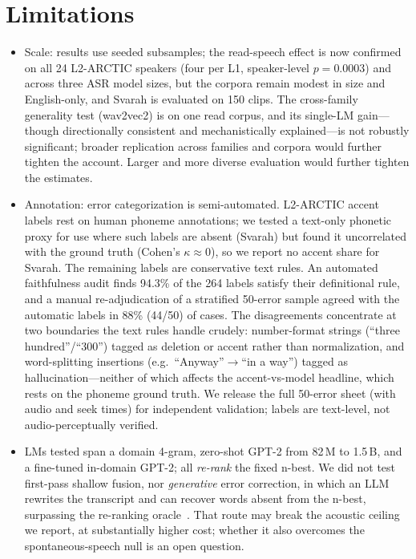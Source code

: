 \documentclass[conference]{IEEEtran}
\begin{document}
\section{Limitations}
\label{sec:lim}
\begin{itemize}
\item Scale: results use seeded subsamples; the read-speech effect is now confirmed on all 24 L2-ARCTIC speakers (four per L1, speaker-level $p=0.0003$) and across three ASR model sizes, but the corpora remain modest in size and English-only, and Svarah is evaluated on 150 clips. The cross-family generality test (wav2vec2) is on one read corpus, and its single-LM gain---though directionally consistent and mechanistically explained---is not robustly significant; broader replication across families and corpora would further tighten the account. Larger and more diverse evaluation would further tighten the estimates.
\item Annotation: error categorization is semi-automated. L2-ARCTIC accent labels rest on human phoneme annotations; we tested a text-only phonetic proxy for use where such labels are absent (Svarah) but found it uncorrelated with the ground truth (Cohen's $\kappa\approx0$), so we report no accent share for Svarah. The remaining labels are conservative text rules. An automated faithfulness audit finds 94.3\% of the 264 labels satisfy their definitional rule, and a manual re-adjudication of a stratified 50-error sample agreed with the automatic labels in 88\% (44/50) of cases. The disagreements concentrate at two boundaries the text rules handle crudely: number-format strings (``three hundred''/``300'') tagged as deletion or accent rather than normalization, and word-splitting insertions (e.g.\ ``Anyway''$\to$``in a way'') tagged as hallucination---neither of which affects the accent-vs-model headline, which rests on the phoneme ground truth. We release the full 50-error sheet (with audio and seek times) for independent validation; labels are text-level, not audio-perceptually verified.
\item LMs tested span a domain 4-gram, zero-shot GPT-2 from 82\,M to 1.5\,B, and a fine-tuned in-domain GPT-2; all \emph{re-rank} the fixed n-best. We did not test first-pass shallow fusion, nor \emph{generative} error correction, in which an LLM rewrites the transcript and can recover words absent from the n-best, surpassing the re-ranking oracle~\cite{hyporadise,whisperingllama,gensec}. That route may break the acoustic ceiling we report, at substantially higher cost; whether it also overcomes the spontaneous-speech null is an open question.
\end{itemize}
\end{document}
